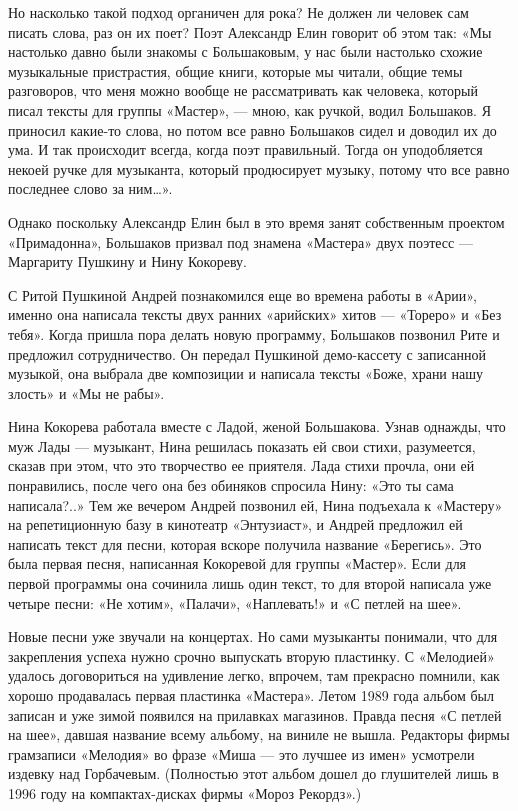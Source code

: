 \documentclass[16pt,a5paper,oneside]{book}
\begin{document}
Но насколько такой подход органичен для рока? Не должен ли человек сам писать слова, раз он их поет? Поэт Александр Елин
говорит об этом так: «Мы настолько давно были знакомы с Большаковым, у нас были настолько схожие музыкальные
пристрастия, общие книги, которые мы читали, общие темы разговоров, что меня можно вообще не рассматривать как человека,
который писал тексты для группы «Мастер», — мною, как ручкой, водил Большаков. Я приносил какие-то слова, но потом все
равно Большаков сидел и доводил их до ума. И так происходит всегда, когда поэт правильный. Тогда он уподобляется некоей
ручке для музыканта, который продюсирует музыку, потому что все равно последнее слово за ним\ldots».

Однако поскольку Александр Елин был в это время занят собственным проектом «Примадонна», Большаков призвал под знамена
«Мастера» двух поэтесс — Маргариту Пушкину и Нину Кокореву.

С Ритой Пушкиной Андрей познакомился еще во времена работы в «Арии», именно она написала тексты двух ранних «арийских»
хитов — «Тореро» и «Без тебя». Когда пришла пора делать новую программу, Большаков позвонил Рите и предложил
сотрудничество. Он передал Пушкиной демо-кассету с записанной музыкой, она выбрала две композиции и написала тексты
«Боже, храни нашу злость» и «Мы не рабы».

Нина Кокорева работала вместе с Ладой, женой Большакова. Узнав однажды, что муж Лады — музыкант, Нина решилась показать
ей свои стихи, разумеется, сказав при этом, что это творчество ее приятеля. Лада стихи прочла, они ей понравились, после
чего она без обиняков спросила Нину: «Это ты сама написала?..» Тем же вечером Андрей позвонил ей, Нина подъехала к
«Мастеру» на репетиционную базу в кинотеатр «Энтузиаст», и Андрей предложил ей написать текст для песни, которая вскоре
получила название «Берегись». Это была первая песня, написанная Кокоревой для группы «Мастер». Если для первой программы
она сочинила лишь один текст, то для второй написала уже четыре песни: «Не хотим», «Палачи», «Наплевать!» и «С петлей на
шее».

Новые песни уже звучали на концертах. Но сами музыканты понимали, что для закрепления успеха нужно срочно выпускать
вторую пластинку. С «Мелодией» удалось договориться на удивление легко, впрочем, там прекрасно помнили, как хорошо
продавалась первая пластинка «Мастера». Летом 1989 года альбом был записан и уже зимой появился на прилавках магазинов.
Правда песня «С петлей на шее», давшая название всему альбому, на виниле не вышла. Редакторы фирмы грамзаписи «Мелодия»
во фразе «Миша — это лучшее из имен» усмотрели издевку над Горбачевым. (Полностью этот альбом дошел до глушителей лишь в
1996 году на компактах-дисках фирмы «Мороз Рекордз».)
\end{document}
